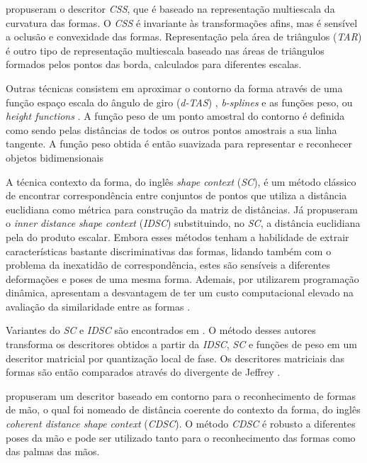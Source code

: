  propuseram o descritor \textit{CSS}, que é baseado na representação multiescala da curvatura das formas. O \textit{CSS} é invariante às transformações afins, mas é sensível a oclusão e convexidade das formas. Representação pela área de triângulos (\textit{TAR}) \cite{Alajlan20117} é outro tipo de representação multiescala baseado nas áreas de triângulos formados pelos pontos das borda, calculados para diferentes escalas. 

Outras técnicas consistem em aproximar o contorno da forma através de uma função espaço escala do ângulo de giro (\textit{d-TAS}) \cite{4202050}, \textit{b-splines} \cite{1168520} e as funções peso, ou \textit{height functions} \cite{Wang2012134}. A função peso de um ponto amostral do contorno é definida como sendo pelas distâncias de todos os outros pontos amostrais a sua linha tangente. A função peso obtida é então suavizada para representar e reconhecer objetos bidimensionais

A técnica contexto da forma, do inglês \textit{shape context} (\textit{SC}), \cite{Belongie:2002} é um método clássico de encontrar correspondência entre conjuntos de pontos que utiliza a distância euclidiana como métrica para construção da matriz de distâncias. Já  propuseram o \textit{inner distance shape context} (\textit{IDSC}) substituindo, no \textit{SC}, a distância euclidiana pela do produto escalar. Embora esses métodos tenham a habilidade de extrair características bastante discriminativas das formas, lidando também com o problema da inexatidão de correspondência, estes são sensíveis a diferentes deformações e poses de uma mesma forma. Ademais, por utilizarem programação dinâmica, apresentam a desvantagem de ter um custo computacional elevado na avaliação da similaridade entre as formas \cite{FreitasS.TorresMiranda2016}.

Variantes do \textit{SC} e \textit{IDSC} são encontrados em \cite{Nanni20122254}. O método desses autores transforma os descritores obtidos a partir da \textit{IDSC}, \textit{SC} e funções de peso em um descritor matricial por quantização local de fase. Os descritores matriciais das formas são então comparados através do divergente de Jeffrey \cite{Ullah1996}.

 propuseram um descritor baseado em contorno para o reconhecimento de formas de mão, o qual foi nomeado de distância coerente do contexto da forma, do inglês \textit{coherent distance shape context} (\textit{CDSC}). O método \textit{CDSC} é robusto a diferentes poses da mão e pode ser utilizado tanto para o reconhecimento das formas como das palmas das mãos.  

